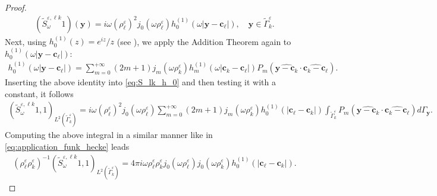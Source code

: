 \documentclass[]{article}
\numberwithin{equation}{section}
\numberwithin{theorem}{section}
\numberwithin{lemma}{section}
\numberwithin{corollary}{section}
\numberwithin{proposition}{section}
\numberwithin{definition}{section}
\newcommand{\bx}{\boldsymbol{x}}
\newcommand{\by}{\boldsymbol{y}}
\newcommand{\bc}{\boldsymbol{c}}
\newcommand{\re}{\varepsilon}
\renewcommand{\vec}{\boldsymbol}
\begin{document}
\begin{proof}
		\begin{align}
			\label{eq:S_lk_h_0}
			(\tilde{S}^{\re, \ell k}_{\omega} 1)(\by) =  i \omega ( \rho^{\re}_{\ell})^2 j_0 (\omega \rho^{\re}_{\ell}) h^{(1)}_0 (\omega|\by-\bc_{\ell}|),\quad \by \in \tilde{\Gamma}^{\re}_k.
		\end{align} 
		Next, using $h^{(1)}_{0} (z) = e^{iz}/z$ (see \cite[p. 438, 10.1.11-10.1.12]{abramowitz}), we apply the Addition Theorem again to $h^{(1)}_0(\omega|\by-\bc_{\ell}|)$:
		\begin{align*}%
			h^{(1)}_{0} (\omega| \by -\bc_{\ell}|) = \sum_{m=0}^{+\infty} (2m+1) j_m(\omega \rho^{\re}_k) h^{(1)}_m(\omega|\bc_k - \bc_{\ell}|) P_{m} (\widehat{\by-\bc_k} \cdot \widehat{\bc_k-\bc_{\ell}}). 
		\end{align*}
		Inserting the above identity into \eqref{eq:S_lk_h_0} and then testing it with a constant, it follows 
		\begin{align*}%
			(\tilde{S}^{\re, \ell k}_{\omega} 1, 1)_{L^2(\tilde{\Gamma}^{\re}_k)} =  i \omega ( \rho^{\re}_{\ell})^2  j_0 (\omega \rho^{\re}_{\ell}) \sum_{m=0}^{+\infty} (2m+1) j_m(\omega \rho^{\re}_k) h^{(1)}_0 (|\bc_{\ell}-\bc_k|) \int_{\tilde{\Gamma}^{\re}_k} P_{m} (\widehat{\by-\bc_k} \cdot \widehat{\bc_k-\bc_{\ell}}) d\Gamma_{\by}.
		\end{align*}
		Computing the above integral in a similar manner like in \eqref{eq:application_funk_hecke} leads
		\begin{align*}%
			(\rho^{\re}_{\ell} \rho^{\re}_{k})^{-1} (\tilde{S}^{\re, \ell k}_{\omega} 1, 1)_{L^2(\tilde{\Gamma}^{\re}_k)} = 4 \pi  i \omega \rho^{\re}_{\ell} \rho^{\re}_{k} j_0 (\omega \rho^{\re}_{\ell})  j_0(\omega \rho^{\re}_k) h^{(1)}_0 (|\bc_{\ell}-\bc_k|).
		\end{align*}

\end{proof}
\end{document}
